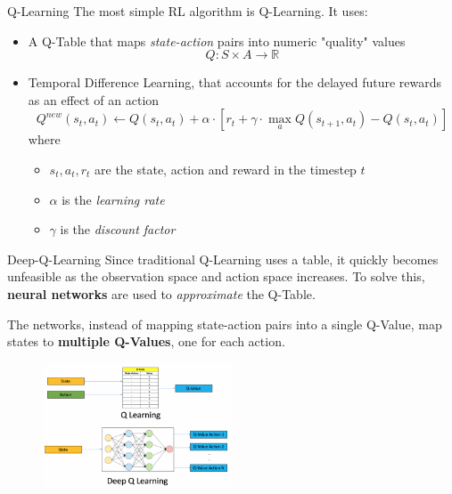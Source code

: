 \documentclass[10pt, xcolor={dvipsnames}]{beamer}
\begin{document}
\begin{frame}{Q-Learning}
    The most simple RL algorithm is \alert{Q-Learning}. It uses:
    \begin{itemize}
        \item A \alert{Q-Table} that maps \textit{state-action} pairs into numeric "quality" values 
        \[Q: S \times A \to \mathbb{R}\]
        \item \alert{Temporal Difference Learning}, that accounts for the delayed future rewards as an effect of an action
        \[Q^{new}(s_t, a_t) \leftarrow Q(s_t, a_t) + \alpha \cdot [r_t + \gamma \cdot \max_a{ Q(s_{t+1}, a_t)} - Q(s_t, a_t)] \]
        where
        \begin{itemize}
            \item $s_t, a_t, r_t$ are the state, action and reward in the timestep $t$
            \item $\alpha$ is the \textit{learning rate}
            \item $\gamma$ is the \textit{discount factor}
        \end{itemize}
    \end{itemize}
\end{frame}

\begin{frame}{Deep-Q-Learning}
    Since traditional Q-Learning uses a table, it quickly becomes unfeasible as the observation space and action space increases. To solve this, \textbf{neural networks} are used to \textit{approximate} the Q-Table.
    
    The networks, instead of mapping state-action pairs into a single Q-Value, map states to \textbf{multiple Q-Values}, one for each action.
    
    \begin{figure}
        \centering
        \includegraphics[width=0.5\textwidth]{assets/rl/q-vs-dqn.png}
    \end{figure}
\end{frame}
\end{document}
